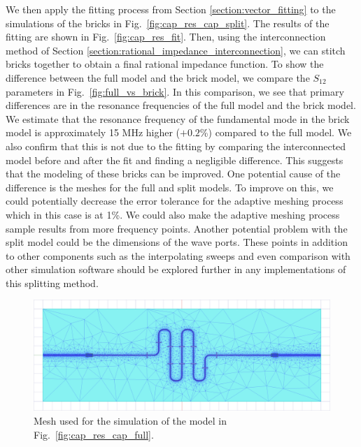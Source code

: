 We then apply the fitting process from Section \ref{section:vector_fitting} to the simulations of the bricks in Fig.\ \ref{fig:cap_res_cap_split}. The results of the fitting are shown in Fig.\ \ref{fig:cap_res_fit}. Then, using the interconnection method of Section \ref{section:rational_impedance_interconnection}, we can stitch bricks together to obtain a final rational impedance function. To show the difference between the full model and the brick model, we compare the $S_{12}$ parameters in Fig.\ \ref{fig:full_vs_brick}. In this comparison, we see that primary differences are in the resonance frequencies of the full model and the brick model. We estimate that the resonance frequency of the fundamental mode in the brick model is approximately 15 MHz higher ($+0.2$\%) compared to the full model. We also confirm that this is not due to the fitting by comparing the interconnected model before and after the fit and finding a negligible difference. This suggests that the modeling of these bricks can be improved. One potential cause of the difference is the meshes for the full and split models. To improve on this, we could potentially decrease the error tolerance for the adaptive meshing process which in this case is at 1\%. We could also make the adaptive meshing process sample results from more frequency points. Another potential problem with the split model could be the dimensions of the wave ports. These points in addition to other components such as the interpolating sweeps and even comparison with other simulation software should be explored further in any implementations of this splitting method.

\begin{figure}[!t]
    \centering
    \includegraphics[width=\textwidth]{figures/cap_res_cap_mesh.png}
    \caption{Mesh used for the simulation of the model in Fig.\ \ref{fig:cap_res_cap_full}.}
    \label{fig:cap_res_cap_mesh}
\end{figure}

